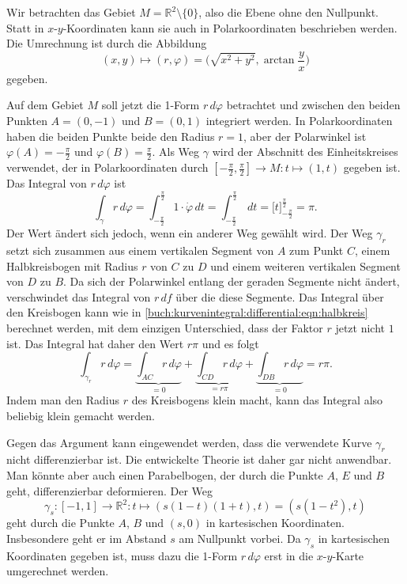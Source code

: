 \begin{beispiel}
\label{buch:kurvenintegral:differential:bsp:wege}

Wir betrachten das Gebiet $M=\mathbb{R}^2\setminus\{0\}$, also die
Ebene ohne den Nullpunkt.
Statt in $x$-$y$-Koordinaten kann sie auch in Polarkoordinaten
beschrieben werden.
%
Die Umrechnung ist durch die Abbildung
\[
(x,y) \mapsto (r,\varphi)=\biggl(\sqrt{x^2+y^2},\arctan\frac{y}{x}\biggr)
\]
gegeben.

Auf dem Gebiet $M$ soll jetzt die 1-Form $r\,d\varphi$ betrachtet und
zwischen den beiden Punkten $A=(0,-1)$ und $B=(0,1)$ integriert werden.
In Polarkoordinaten haben die beiden Punkte beide den Radius $r=1$,
aber der Polarwinkel ist $\varphi(A) = -\frac{\pi}2$ und
$\varphi(B)=\frac{\pi}2$.
Als Weg $\gamma$ wird der Abschnitt des Einheitskreises verwendet, der in
Polarkoordinaten durch $[-\frac{\pi}2,\frac{\pi}2]\to M:t\mapsto (1,t)$ 
gegeben ist.
Das Integral von $r\,d\varphi$ ist
\begin{equation}
\int_{\gamma} r\,d\varphi
=
\int_{-\frac{\pi}2}^{\frac{\pi}2}
1\cdot \dot{\varphi}\,dt
=
\int_{-\frac{\pi}2}^{\frac{\pi}2}\,dt
=
\bigl[t\bigr]_{-\frac{\pi}2}^{\frac{\pi}2}
=
\pi.
\label{buch:kurvenintegral:differential:eqn:halbkreis}
\end{equation}
Der Wert ändert sich jedoch, wenn ein anderer Weg gewählt wird.
Der Weg $\gamma_r$ setzt sich zusammen aus einem vertikalen
Segment von $A$ zum Punkt $C$, einem Halbkreisbogen mit
Radius $r$ von $C$ zu $D$ und einem weiteren vertikalen Segment
von $D$ zu $B$.
Da sich der Polarwinkel entlang der geraden Segmente nicht ändert,
verschwindet das Integral von $r\,df$ über die diese Segmente.
Das Integral über den Kreisbogen kann wie in 
\eqref{buch:kurvenintegral:differential:eqn:halbkreis}
berechnet werden, mit dem einzigen Unterschied, dass der Faktor $r$
jetzt nicht $1$ ist.
Das Integral hat daher den Wert $r\pi$ und es folgt
\[
\int_{\gamma_r} r\,d\varphi
=
\underbrace{\int_{AC} r\,d\varphi}_{\displaystyle = 0}
+
\underbrace{\int_{CD} r\,d\varphi}_{\displaystyle = r\pi}
+
\underbrace{\int_{DB} r\,d\varphi}_{\displaystyle = 0}
=
r\pi.
\]
Indem man den Radius $r$ des Kreisbogens klein macht, kann das Integral
also beliebig klein gemacht werden.

Gegen das Argument kann eingewendet werden, dass die verwendete 
Kurve $\gamma_r$ nicht differenzierbar ist.
Die entwickelte Theorie ist daher gar nicht anwendbar.
Man könnte aber auch einen Parabelbogen, der durch die Punkte 
$A$, $E$ und $B$ geht, differenzierbar deformieren.
Der Weg 
\[
\gamma_s
\colon
[-1,1]
\to
\mathbb{R}^2
:
t\mapsto (s(1-t)(1+t), t)=(s(1-t^2),t)
\]
geht durch die Punkte $A$, $B$ und $(s,0)$ in kartesischen
Koordinaten.
Insbesondere geht er im Abstand $s$ am Nullpunkt vorbei.
Da $\gamma_s$ in kartesischen Koordinaten gegeben ist, muss
dazu die 1-Form $r\,d\varphi$ erst in die $x$-$y$-Karte umgerechnet
werden.


\end{beispiel}
